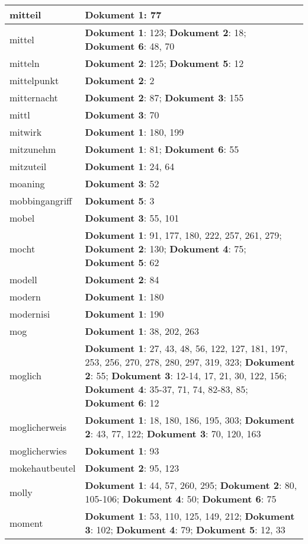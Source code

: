 \documentclass[a5paper]{article}
\begin{document}
\begin{longtable}[l]{|l|p{3in}|}
\hline
mitteil & \textbf{Dokument 1}: 77 \\
\hline
mittel & \textbf{Dokument 1}: 123; \textbf{Dokument 2}: 18; \textbf{Dokument 6}: 48, 70 \\
\hline
mitteln & \textbf{Dokument 2}: 125; \textbf{Dokument 5}: 12 \\
\hline
mittelpunkt & \textbf{Dokument 2}: 2 \\
\hline
mitternacht & \textbf{Dokument 2}: 87; \textbf{Dokument 3}: 155 \\
\hline
mittl & \textbf{Dokument 3}: 70 \\
\hline
mitwirk & \textbf{Dokument 1}: 180, 199 \\
\hline
mitzunehm & \textbf{Dokument 1}: 81; \textbf{Dokument 6}: 55 \\
\hline
mitzuteil & \textbf{Dokument 1}: 24, 64 \\
\hline
moaning & \textbf{Dokument 3}: 52 \\
\hline
mobbingangriff & \textbf{Dokument 5}: 3 \\
\hline
mobel & \textbf{Dokument 3}: 55, 101 \\
\hline
mocht & \textbf{Dokument 1}: 91, 177, 180, 222, 257, 261, 279; \textbf{Dokument 2}: 130; \textbf{Dokument 4}: 75; \textbf{Dokument 5}: 62 \\
\hline
modell & \textbf{Dokument 2}: 84 \\
\hline
modern & \textbf{Dokument 1}: 180 \\
\hline
modernisi & \textbf{Dokument 1}: 190 \\
\hline
mog & \textbf{Dokument 1}: 38, 202, 263 \\
\hline
moglich & \textbf{Dokument 1}: 27, 43, 48, 56, 122, 127, 181, 197, 253, 256, 270, 278, 280, 297, 319, 323; \textbf{Dokument 2}: 55; \textbf{Dokument 3}: 12-14, 17, 21, 30, 122, 156; \textbf{Dokument 4}: 35-37, 71, 74, 82-83, 85; \textbf{Dokument 6}: 12 \\
\hline
moglicherweis & \textbf{Dokument 1}: 18, 180, 186, 195, 303; \textbf{Dokument 2}: 43, 77, 122; \textbf{Dokument 3}: 70, 120, 163 \\
\hline
moglicherwies & \textbf{Dokument 1}: 93 \\
\hline
mokehautbeutel & \textbf{Dokument 2}: 95, 123 \\
\hline
molly & \textbf{Dokument 1}: 44, 57, 260, 295; \textbf{Dokument 2}: 80, 105-106; \textbf{Dokument 4}: 50; \textbf{Dokument 6}: 75 \\
\hline
moment & \textbf{Dokument 1}: 53, 110, 125, 149, 212; \textbf{Dokument 3}: 102; \textbf{Dokument 4}: 79; \textbf{Dokument 5}: 12, 33 \\

\end{longtable}
\end{document}
